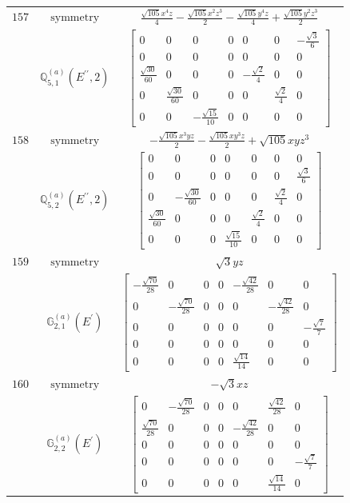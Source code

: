 \documentclass[fleqn,8pt,landscape]{jsarticle}
\begin{document}
\begin{longtable}{ccc}
$ 157 $ & $ \text{symmetry} $ & $ \frac{\sqrt{105} x^{4} z}{4} - \frac{\sqrt{105} x^{2} z^{3}}{2} - \frac{\sqrt{105} y^{4} z}{4} + \frac{\sqrt{105} y^{2} z^{3}}{2} $ \\
$  $ & $ \mathbb{Q}_{5,1}^{(a)}(E^{\prime\prime},2) $ & $ \begin{bmatrix} 0 & 0 & 0 & 0 & 0 & 0 & - \frac{\sqrt{3}}{6} \\ 0 & 0 & 0 & 0 & 0 & 0 & 0 \\ \frac{\sqrt{30}}{60} & 0 & 0 & 0 & - \frac{\sqrt{2}}{4} & 0 & 0 \\ 0 & \frac{\sqrt{30}}{60} & 0 & 0 & 0 & \frac{\sqrt{2}}{4} & 0 \\ 0 & 0 & - \frac{\sqrt{15}}{10} & 0 & 0 & 0 & 0 \end{bmatrix} $ \\ \hline
$ 158 $ & $ \text{symmetry} $ & $ - \frac{\sqrt{105} x^{3} y z}{2} - \frac{\sqrt{105} x y^{3} z}{2} + \sqrt{105} x y z^{3} $ \\
$  $ & $ \mathbb{Q}_{5,2}^{(a)}(E^{\prime\prime},2) $ & $ \begin{bmatrix} 0 & 0 & 0 & 0 & 0 & 0 & 0 \\ 0 & 0 & 0 & 0 & 0 & 0 & \frac{\sqrt{3}}{6} \\ 0 & - \frac{\sqrt{30}}{60} & 0 & 0 & 0 & \frac{\sqrt{2}}{4} & 0 \\ \frac{\sqrt{30}}{60} & 0 & 0 & 0 & \frac{\sqrt{2}}{4} & 0 & 0 \\ 0 & 0 & 0 & \frac{\sqrt{15}}{10} & 0 & 0 & 0 \end{bmatrix} $ \\ \hline
$ 159 $ & $ \text{symmetry} $ & $ \sqrt{3} y z $ \\
$  $ & $ \mathbb{G}_{2,1}^{(a)}(E^{\prime}) $ & $ \begin{bmatrix} - \frac{\sqrt{70}}{28} & 0 & 0 & 0 & - \frac{\sqrt{42}}{28} & 0 & 0 \\ 0 & - \frac{\sqrt{70}}{28} & 0 & 0 & 0 & - \frac{\sqrt{42}}{28} & 0 \\ 0 & 0 & 0 & 0 & 0 & 0 & - \frac{\sqrt{7}}{7} \\ 0 & 0 & 0 & 0 & 0 & 0 & 0 \\ 0 & 0 & 0 & 0 & \frac{\sqrt{14}}{14} & 0 & 0 \end{bmatrix} $ \\ \hline
$ 160 $ & $ \text{symmetry} $ & $ - \sqrt{3} x z $ \\
$  $ & $ \mathbb{G}_{2,2}^{(a)}(E^{\prime}) $ & $ \begin{bmatrix} 0 & - \frac{\sqrt{70}}{28} & 0 & 0 & 0 & \frac{\sqrt{42}}{28} & 0 \\ \frac{\sqrt{70}}{28} & 0 & 0 & 0 & - \frac{\sqrt{42}}{28} & 0 & 0 \\ 0 & 0 & 0 & 0 & 0 & 0 & 0 \\ 0 & 0 & 0 & 0 & 0 & 0 & - \frac{\sqrt{7}}{7} \\ 0 & 0 & 0 & 0 & 0 & \frac{\sqrt{14}}{14} & 0 \end{bmatrix} $ \\ \hline

\end{longtable}
\end{document}
